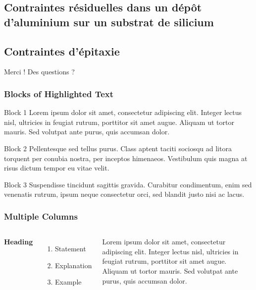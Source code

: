 \documentclass{beamer}
\begin{document}
\subsection{Contraintes résiduelles dans un dépôt d'aluminium sur un substrat de silicium} 
\subsection{Contraintes d'épitaxie} 


\begin{frame}
    \Huge{\centerline{Merci ! Des questions ?}}
\end{frame}
    


\begin{frame}
\frametitle{Blocks of Highlighted Text}
\begin{block}{Block 1}
Lorem ipsum dolor sit amet, consectetur adipiscing elit. Integer lectus nisl, ultricies in feugiat rutrum, porttitor sit amet augue. Aliquam ut tortor mauris. Sed volutpat ante purus, quis accumsan dolor.
\end{block}

\begin{block}{Block 2}
Pellentesque sed tellus purus. Class aptent taciti sociosqu ad litora torquent per conubia nostra, per inceptos himenaeos. Vestibulum quis magna at risus dictum tempor eu vitae velit.
\end{block}

\begin{block}{Block 3}
Suspendisse tincidunt sagittis gravida. Curabitur condimentum, enim sed venenatis rutrum, ipsum neque consectetur orci, sed blandit justo nisi ac lacus.
\end{block}
\end{frame}


\begin{frame}
\frametitle{Multiple Columns}
\begin{columns}[c] %

\textbf{Heading}
\begin{enumerate}
\item Statement
\item Explanation
\item Example
\end{enumerate}

Lorem ipsum dolor sit amet, consectetur adipiscing elit. Integer lectus nisl, ultricies in feugiat rutrum, porttitor sit amet augue. Aliquam ut tortor mauris. Sed volutpat ante purus, quis accumsan dolor.

\end{columns}
\end{frame}
\end{document}
